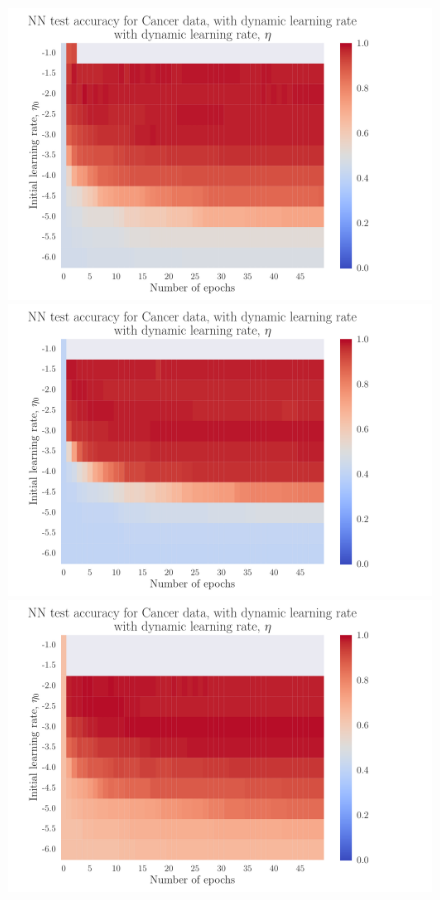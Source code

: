 \documentclass[12pt]{extarticle}
\begin{document}
\begin{figure}[h]
	\includegraphics[width=\linewidth]{plots/NN_Cancer__epochs_dynamic_eta__test_accuracy__relu__183872.pdf}
	\endminipage\hfill
	\includegraphics[width=\linewidth]{plots/NN_Cancer__epochs_dynamic_eta__test_accuracy__relu__605661.pdf}
	\endminipage\hfill
	\includegraphics[width=\linewidth]{plots/NN_Cancer__epochs_dynamic_eta__test_accuracy__relu__495223.pdf}

\end{figure}
\end{document}
